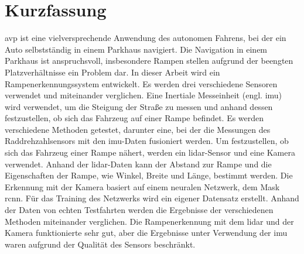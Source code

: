 \chapter*{Kurzfassung}
\label{ch:Kurzfassung}
\gls{avp} ist eine vielversprechende Anwendung des autonomen Fahrens, bei der ein Auto selbstst\"andig in einem Parkhaus navigiert.
Die Navigation in einem Parkhaus ist anspruchsvoll, insbesondere Rampen stellen aufgrund der beengten Platzverh\"altnisse ein Problem dar.
In dieser Arbeit wird ein Rampenerkennungssystem entwickelt.
Es werden drei verschiedene Sensoren verwendet und miteinander verglichen.
Eine Inertiale Messeinheit  (engl. \gls{imu}) wird verwendet, um die Steigung der Stra\ss e zu messen und anhand dessen festzustellen, ob sich das Fahrzeug auf einer Rampe befindet.
Es werden verschiedene Methoden getestet, darunter eine, bei der die Messungen des Raddrehzahlsensors mit den \gls{imu}-Daten fusioniert werden.
Um festzustellen, ob sich das Fahrzeug einer Rampe n\"ahert, werden ein \gls{lidar}-Sensor und eine Kamera verwendet.
Anhand der \gls{lidar}-Daten kann der Abstand zur Rampe und die Eigenschaften der Rampe, wie Winkel, Breite und L\"ange, bestimmt werden.
Die Erkennung mit der Kamera basiert auf einem neuralen Netzwerk, dem Mask \gls{rcnn}.
F\"ur das Training des Netzwerks wird ein eigener Datensatz erstellt.
Anhand der Daten von echten Testfahrten werden die Ergebnisse der verschiedenen Methoden miteinander verglichen.
Die Rampenerkennung mit dem \gls{lidar} und der Kamera funktionierte sehr gut, aber die Ergebnisse unter Verwendung der \gls{imu} waren aufgrund der Qualit\"at des Sensors beschr\"ankt.